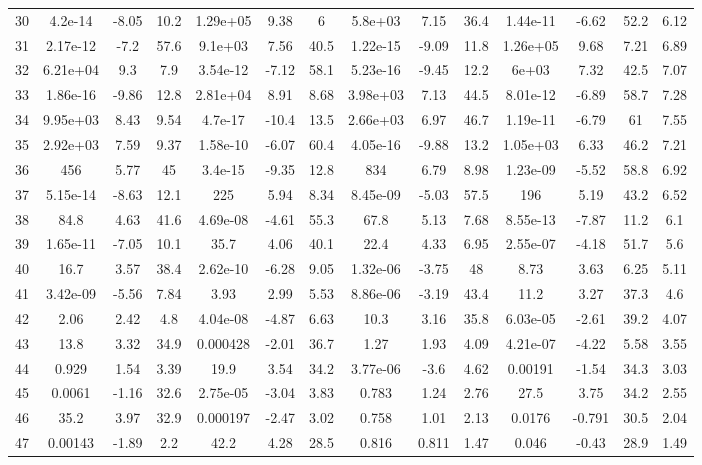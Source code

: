 \documentclass[]{aiaa-tc}%
\begin{document}
\begin{table}[h]
{\begin{tabular}{lccccccccccccc}
30 & 4.2e-14 & -8.05 & 10.2 & 1.29e+05 & 9.38 & 6 & 5.8e+03 & 7.15 & 36.4 & 1.44e-11 & -6.62 & 52.2 & 6.12\\
31 & 2.17e-12 & -7.2 & 57.6 & 9.1e+03 & 7.56 & 40.5 & 1.22e-15 & -9.09 & 11.8 & 1.26e+05 & 9.68 & 7.21 & 6.89\\
32 & 6.21e+04 & 9.3 & 7.9 & 3.54e-12 & -7.12 & 58.1 & 5.23e-16 & -9.45 & 12.2 & 6e+03 & 7.32 & 42.5 & 7.07\\
33 & 1.86e-16 & -9.86 & 12.8 & 2.81e+04 & 8.91 & 8.68 & 3.98e+03 & 7.13 & 44.5 & 8.01e-12 & -6.89 & 58.7 & 7.28\\
34 & 9.95e+03 & 8.43 & 9.54 & 4.7e-17 & -10.4 & 13.5 & 2.66e+03 & 6.97 & 46.7 & 1.19e-11 & -6.79 & 61 & 7.55\\
35 & 2.92e+03 & 7.59 & 9.37 & 1.58e-10 & -6.07 & 60.4 & 4.05e-16 & -9.88 & 13.2 & 1.05e+03 & 6.33 & 46.2 & 7.21\\
36 & 456 & 5.77 & 45 & 3.4e-15 & -9.35 & 12.8 & 834 & 6.79 & 8.98 & 1.23e-09 & -5.52 & 58.8 & 6.92\\
37 & 5.15e-14 & -8.63 & 12.1 & 225 & 5.94 & 8.34 & 8.45e-09 & -5.03 & 57.5 & 196 & 5.19 & 43.2 & 6.52\\
38 & 84.8 & 4.63 & 41.6 & 4.69e-08 & -4.61 & 55.3 & 67.8 & 5.13 & 7.68 & 8.55e-13 & -7.87 & 11.2 & 6.1\\
39 & 1.65e-11 & -7.05 & 10.1 & 35.7 & 4.06 & 40.1 & 22.4 & 4.33 & 6.95 & 2.55e-07 & -4.18 & 51.7 & 5.6\\
40 & 16.7 & 3.57 & 38.4 & 2.62e-10 & -6.28 & 9.05 & 1.32e-06 & -3.75 & 48 & 8.73 & 3.63 & 6.25 & 5.11\\
41 & 3.42e-09 & -5.56 & 7.84 & 3.93 & 2.99 & 5.53 & 8.86e-06 & -3.19 & 43.4 & 11.2 & 3.27 & 37.3 & 4.6\\
42 & 2.06 & 2.42 & 4.8 & 4.04e-08 & -4.87 & 6.63 & 10.3 & 3.16 & 35.8 & 6.03e-05 & -2.61 & 39.2 & 4.07\\
43 & 13.8 & 3.32 & 34.9 & 0.000428 & -2.01 & 36.7 & 1.27 & 1.93 & 4.09 & 4.21e-07 & -4.22 & 5.58 & 3.55\\
44 & 0.929 & 1.54 & 3.39 & 19.9 & 3.54 & 34.2 & 3.77e-06 & -3.6 & 4.62 & 0.00191 & -1.54 & 34.3 & 3.03\\
45 & 0.0061 & -1.16 & 32.6 & 2.75e-05 & -3.04 & 3.83 & 0.783 & 1.24 & 2.76 & 27.5 & 3.75 & 34.2 & 2.55\\
46 & 35.2 & 3.97 & 32.9 & 0.000197 & -2.47 & 3.02 & 0.758 & 1.01 & 2.13 & 0.0176 & -0.791 & 30.5 & 2.04\\
47 & 0.00143 & -1.89 & 2.2 & 42.2 & 4.28 & 28.5 & 0.816 & 0.811 & 1.47 & 0.046 & -0.43 & 28.9 & 1.49\\

\end{tabular}}
\end{table}
\end{document}
